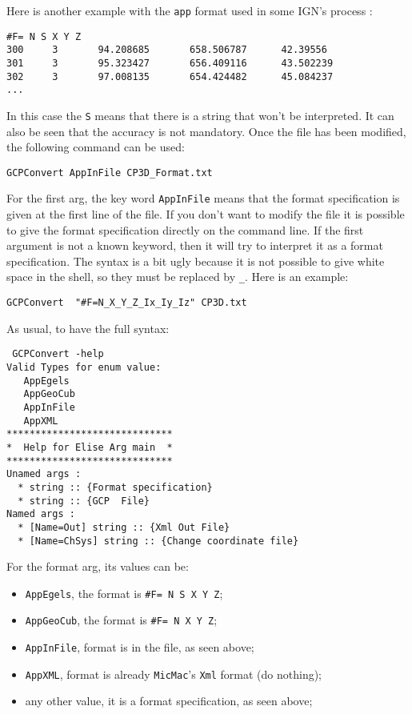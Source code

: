 Here is another example with the {\tt app} format used in some IGN's process :

\begin{verbatim}
#F= N S X Y Z
300     3       94.208685       658.506787      42.39556
301     3       95.323427       656.409116      43.502239
302     3       97.008135       654.424482      45.084237
...
\end{verbatim}

In this case  the {\tt S} means that there is a string that won't be interpreted. It can
also be seen that the accuracy is not mandatory.
Once the file has been modified, the following command can be used:

\begin{verbatim}
GCPConvert AppInFile CP3D_Format.txt
\end{verbatim}

For the first arg, the key word {\tt AppInFile} means that the format specification is given
at the first line of the file. If you don't want to modify the file it is possible to
give the format specification directly on the command line. If the first argument is not
a known keyword, then it will try to interpret it as a format specification. The syntax
is a bit ugly because it is not possible to give white space in the shell, so they must
be replaced by {\tt \_}. Here is an example:

\begin{verbatim}
GCPConvert  "#F=N_X_Y_Z_Ix_Iy_Iz" CP3D.txt
\end{verbatim}

As usual, to have the full syntax:

\begin{verbatim}
 GCPConvert -help
Valid Types for enum value:
   AppEgels
   AppGeoCub
   AppInFile
   AppXML
*****************************
*  Help for Elise Arg main  *
*****************************
Unamed args :
  * string :: {Format specification}
  * string :: {GCP  File}
Named args :
  * [Name=Out] string :: {Xml Out File}
  * [Name=ChSys] string :: {Change coordinate file}
\end{verbatim}


For the format arg, its values can be:

\begin{itemize}
   \item  {\tt AppEgels}, the format  is {\tt \#F= N S X Y Z};
   \item  {\tt AppGeoCub}, the format  is {\tt \#F= N X Y Z};
   \item  {\tt AppInFile}, format is in the file, as seen above;
   \item  {\tt AppXML}, format is already {\tt MicMac}'s {\tt Xml} format (do nothing);
   \item  any other value, it is a format specification, as seen above;
\end{itemize}

